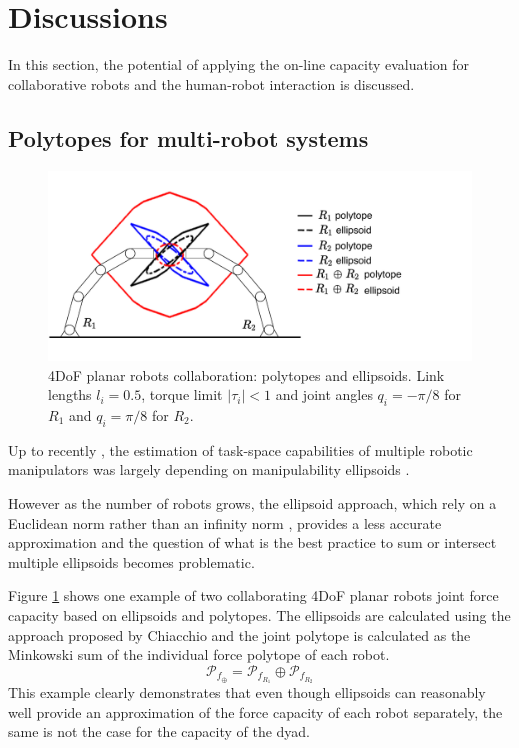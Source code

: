 \section{Discussions}
\label{sec:discussion}
In this section, the potential of applying the on-line capacity evaluation for collaborative robots and the human-robot interaction is discussed.


\subsection{Polytopes for multi-robot systems}
\begin{figure}[!h]
    \centering
    \includegraphics[width=\linewidth]{Papers/images/collaborative_difference.pdf}
    \caption{4DoF planar robots collaboration: polytopes and ellipsoids. Link lengths $l_i$$=$$0.5$, torque limit $|\tau_i|$$<$$1$ and joint angles $q_i$$=$$-\pi/8$ for $R_1$ and $q_i$$=$$\pi/8$ for $R_2$.}
    \label{fig:collaborative_difference}
\end{figure}

Up to recently \cite{long2020constrained}, the estimation of task-space capabilities of multiple robotic manipulators was largely depending on manipulability ellipsoids \cite{chiacchio_task_1991}\cite{chiacchio_global_1991}\cite{lee_dual_1989}.

However as the number of robots grows, the ellipsoid approach, which rely on a Euclidean norm rather than an infinity norm \cite{merlet_jacobian_2006}, provides a less accurate approximation and the question of what is the best practice to sum \cite{chiacchio_task_1991}\cite{julio_frantz_analysis_2015} or intersect \cite{sekiguchi_force_2017}\cite{lee_dual_1989} multiple ellipsoids becomes problematic. 

Figure \ref{fig:collaborative_difference} shows one example of two collaborating 4DoF planar robots joint force capacity based on ellipsoids and polytopes.  The ellipsoids are calculated using the approach proposed by Chiacchio \cite{chiacchio_task_1991} and the joint polytope is calculated as the Minkowski sum of the individual force polytope of each robot.
\begin{equation}
\mathcal{P}_{f_\oplus} = \mathcal{P}_{f_{R_1}} \oplus \mathcal{P}_{f_{R_2}} 
\end{equation}
This example clearly demonstrates that even though ellipsoids can reasonably well provide an approximation of the force capacity of each robot separately, the same is not the case for the capacity of the dyad.

